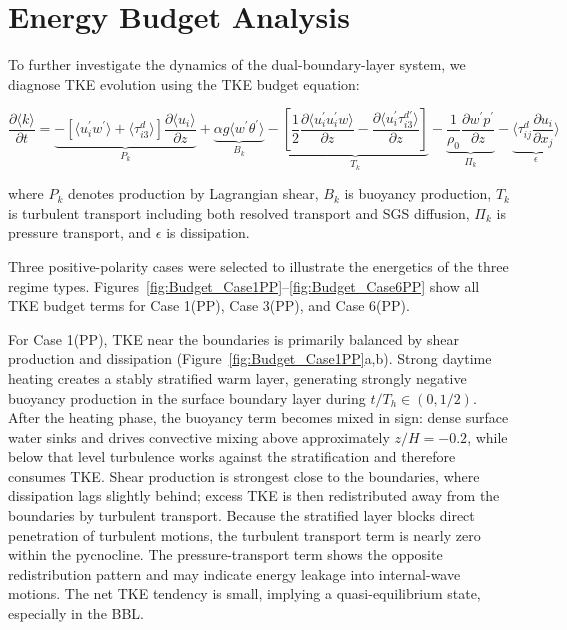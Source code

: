 \documentclass[draft]{agujournal2019}
\begin{document}
\section{Energy Budget Analysis}
\label{sec:Budget}
To further investigate the dynamics of the dual-boundary-layer system, we diagnose TKE evolution using the TKE budget equation:
\begin{linenomath*}
\begin{equation}
\frac{\partial \langle k\rangle}{\partial t}=\underbrace{-[\langle u_i^\prime w^\prime\rangle+\langle\tau_{i3}^d\rangle]\frac{\partial \langle u_i\rangle}{\partial z}}_{P_k} +\underbrace{\alpha g\langle w^\prime \theta^\prime\rangle}_{B_k}-\underbrace{[\frac{1}{2}\frac{\partial\langle u^\prime_iu^\prime_iw\rangle}{\partial z}-\frac{\partial\langle u^\prime_i\tau^{d\prime}_{i3}\rangle}{\partial z}]}_{T_k}-\underbrace{\frac{1}{\rho_0}\frac{\partial w^\prime p^\prime}{\partial z}}_{\Pi_k}-\underbrace{\langle \tau_{ij}^d\frac{\partial u_i}{\partial x_j}\rangle}_{\epsilon} \,
\label{eq:Budgets}
\end{equation}
\end{linenomath*}
where $P_k$ denotes production by Lagrangian shear, $B_k$ is buoyancy production, $T_k$ is turbulent transport including both resolved transport and SGS diffusion, $\Pi_k$ is pressure transport, and $\epsilon$ is dissipation.

Three positive-polarity cases were selected to illustrate the energetics of the three regime types. Figures~\ref{fig:Budget_Case1PP}--\ref{fig:Budget_Case6PP} show all TKE budget terms for Case 1(PP), Case 3(PP), and Case 6(PP).

For Case 1(PP), TKE near the boundaries is primarily balanced by shear production and dissipation (Figure~\ref{fig:Budget_Case1PP}a,b). Strong daytime heating creates a stably stratified warm layer, generating strongly negative buoyancy production in the surface boundary layer during $t/T_h\in(0,1/2)$. After the heating phase, the buoyancy term becomes mixed in sign: dense surface water sinks and drives convective mixing above approximately $z/H=-0.2$, while below that level turbulence works against the stratification and therefore consumes TKE. Shear production is strongest close to the boundaries, where dissipation lags slightly behind; excess TKE is then redistributed away from the boundaries by turbulent transport. Because the stratified layer blocks direct penetration of turbulent motions, the turbulent transport term is nearly zero within the pycnocline. The pressure-transport term shows the opposite redistribution pattern and may indicate energy leakage into internal-wave motions. The net TKE tendency is small, implying a quasi-equilibrium state, especially in the BBL. 
\end{document}
